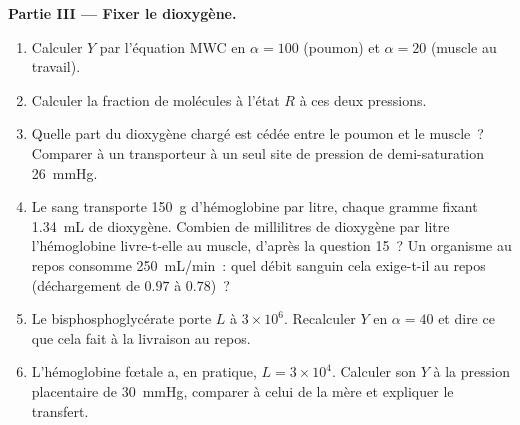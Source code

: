 \begin{problem}
\medskip
\noindent\textbf{Partie III --- Fixer le dioxygène.}
\begin{enumerate}[resume]
  \item Calculer $Y$ par l'équation MWC en $\alpha = 100$ (poumon) et
        $\alpha = 20$ (muscle au travail).
  \item Calculer la fraction de molécules à l'état $R$ à ces deux
        pressions.
  \item Quelle part du dioxygène chargé est cédée entre le poumon et le
        muscle~? Comparer à un transporteur à un seul site de pression
        de demi-saturation \qty{26}{mmHg}.
  \item Le sang transporte \qty{150}{g} d'hémoglobine par litre,
        chaque gramme fixant \qty{1.34}{mL} de dioxygène. Combien de
        millilitres de dioxygène par litre l'hémoglobine livre-t-elle
        au muscle, d'après la question 15~? Un organisme au repos
        consomme \qty{250}{mL/min}~: quel débit sanguin cela exige-t-il
        au repos (déchargement de $0.97$ à $0.78$)~?
  \item Le bisphosphoglycérate porte $L$ à $3\times 10^{6}$. Recalculer
        $Y$ en $\alpha = 40$ et dire ce que cela fait à la livraison au
        repos.
  \item L'hémoglobine fœtale a, en pratique, $L = 3\times 10^{4}$.
        Calculer son $Y$ à la pression placentaire de \qty{30}{mmHg},
        comparer à celui de la mère et expliquer le transfert.
\end{enumerate}


\end{problem}
